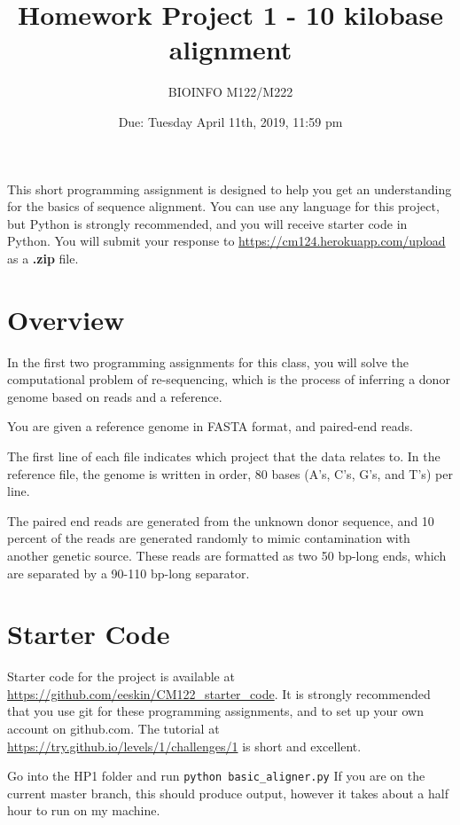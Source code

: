 \documentclass{article}
\begin{document}
\title{Homework Project 1 - 10 kilobase alignment}

\author{BIOINFO M122/M222}

\date{Due: Tuesday April 11th, 2019, 11:59 pm}

\maketitle

This short programming assignment is designed to help you get an
understanding for the basics of sequence alignment. You can use any language
for this project, but Python is strongly recommended, and you will receive starter code in Python. You will submit your response to \url{https://cm124.herokuapp.com/upload} as a \textbf{.zip} file.

\section*{Overview}
In the first two programming assignments for this class, you will solve the computational problem of re-sequencing, which is the process of inferring a donor genome based on reads and a reference. 

You are given a reference genome in FASTA format, and paired-end reads.

The first line of each file indicates which project that the data relates to. In the reference file, the genome is written in order, 80 bases (A's, C's, G's, and T's) per line.

The paired end reads are generated from the unknown donor sequence, and 10 percent of the reads are generated randomly to mimic contamination with another genetic source. These reads are formatted as two 50 bp-long ends, which are separated by a 90-110 bp-long separator. 

\section*{Starter Code}

Starter code for the project is available at \url{https://github.com/eeskin/CM122_starter_code}. It is strongly recommended that you use git for these programming assignments, and to set up your own account on github.com. The tutorial at \url{https://try.github.io/levels/1/challenges/1} is short and excellent.

Go into the HP1 folder and run \verb!python basic_aligner.py! If you are on the current master branch, this should produce output, however it takes about a half hour to run on my machine.
\end{document}
